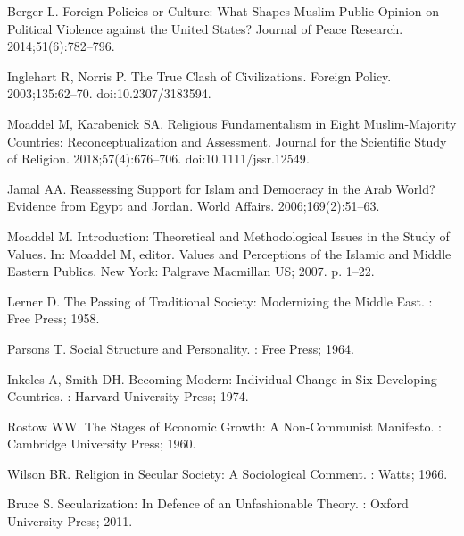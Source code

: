 \documentclass[10pt,letterpaper]{article}
\begin{document}
\begin{thebibliography}{10}
Berger L.
\newblock Foreign Policies or Culture: {{What}} Shapes {{Muslim}} Public
  Opinion on Political Violence against the {{United States}}?
\newblock Journal of Peace Research. 2014;51(6):782--796.

Inglehart R, Norris P.
\newblock The {{True Clash}} of {{Civilizations}}.
\newblock Foreign Policy. 2003;135:62--70.
\newblock doi:{10.2307/3183594}.

Moaddel M, Karabenick SA.
\newblock Religious {{Fundamentalism}} in {{Eight Muslim}}-{{Majority
  Countries}}: {{Reconceptualization}} and {{Assessment}}.
\newblock Journal for the Scientific Study of Religion. 2018;57(4):676--706.
\newblock doi:{10.1111/jssr.12549}.

Jamal AA.
\newblock Reassessing {{Support}} for {{Islam}} and {{Democracy}} in the {{Arab
  World}}? {{Evidence}} from {{Egypt}} and {{Jordan}}.
\newblock World Affairs. 2006;169(2):51--63.

Moaddel M.
\newblock Introduction: {{Theoretical}} and {{Methodological Issues}} in the
  {{Study}} of {{Values}}.
\newblock In: Moaddel M, editor. Values and {{Perceptions}} of the {{Islamic}}
  and {{Middle Eastern Publics}}. {New York}: {Palgrave Macmillan US}; 2007. p.
  1--22.

Lerner D.
\newblock The {{Passing}} of {{Traditional Society}}: {{Modernizing}} the
  {{Middle East}}.
: {Free Press}; 1958.

Parsons T.
\newblock Social {{Structure}} and {{Personality}}.
: {Free Press}; 1964.

Inkeles A, Smith DH.
\newblock Becoming {{Modern}}: {{Individual Change}} in {{Six Developing
  Countries}}.
: {Harvard University Press}; 1974.

Rostow WW.
\newblock The {{Stages}} of {{Economic Growth}}: A Non-{{Communist Manifesto}}.
: {Cambridge University Press}; 1960.

Wilson BR.
\newblock Religion in {{Secular Society}}: A {{Sociological Comment}}.
: {Watts}; 1966.

Bruce S.
\newblock Secularization: {{In Defence}} of an {{Unfashionable Theory}}.
: {Oxford University Press}; 2011.


\end{thebibliography}
\end{document}
